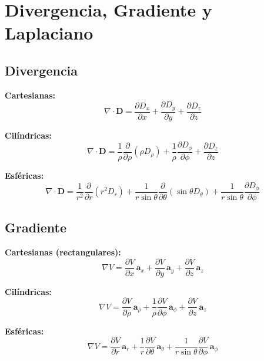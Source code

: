 \documentclass[11pt]{article}
\begin{document}
\newpage

\section{Divergencia, Gradiente y Laplaciano}

\subsection{Divergencia}

\textbf{Cartesianas:}
\begin{equation}
    \nabla \cdot \mathbf{D} = \frac{\partial D_x}{\partial x} + \frac{\partial D_y}{\partial y} + \frac{\partial D_z}{\partial z}
\end{equation}

\textbf{Cilíndricas:}
\begin{equation}
    \nabla \cdot \mathbf{D} = \frac{1}{\rho} \frac{\partial}{\partial \rho} (\rho D_\rho) + \frac{1}{\rho} \frac{\partial D_\phi}{\partial \phi} + \frac{\partial D_z}{\partial z}
\end{equation}

\textbf{Esféricas:}
\begin{equation}
    \nabla \cdot \mathbf{D} = \frac{1}{r^2} \frac{\partial}{\partial r} (r^2 D_r) + \frac{1}{r \sin \theta} \frac{\partial}{\partial \theta} (\sin \theta D_\theta) + \frac{1}{r \sin \theta} \frac{\partial D_\phi}{\partial \phi}
\end{equation}

\subsection{Gradiente}

\textbf{Cartesianas (rectangulares):}
\begin{equation}
    \nabla V = \frac{\partial V}{\partial x} \, \mathbf{a}_x + \frac{\partial V}{\partial y} \, \mathbf{a}_y + \frac{\partial V}{\partial z} \, \mathbf{a}_z
\end{equation}

\textbf{Cilíndricas:}
\begin{equation}
    \nabla V = \frac{\partial V}{\partial \rho} \, \mathbf{a}_\rho + \frac{1}{\rho} \frac{\partial V}{\partial \phi} \, \mathbf{a}_\phi + \frac{\partial V}{\partial z} \, \mathbf{a}_z
\end{equation}

\textbf{Esféricas:}
\begin{equation}
    \nabla V = \frac{\partial V}{\partial r} \, \mathbf{a}_r + \frac{1}{r} \frac{\partial V}{\partial \theta} \, \mathbf{a}_\theta + \frac{1}{r \sin \theta} \frac{\partial V}{\partial \phi} \, \mathbf{a}_\phi
\end{equation}
\end{document}
